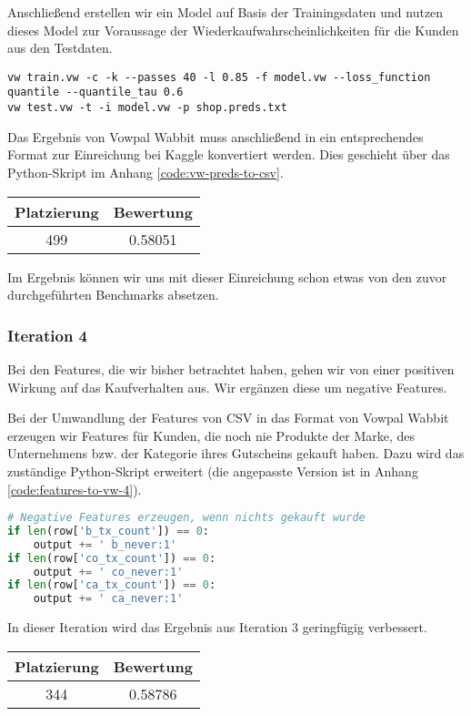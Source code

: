 Anschließend erstellen wir ein Model auf Basis der Trainingsdaten und nutzen dieses
Model zur Voraussage der Wiederkaufwahrscheinlichkeiten für die Kunden aus den Testdaten.
\begin{lstlisting}
vw train.vw -c -k --passes 40 -l 0.85 -f model.vw --loss_function quantile --quantile_tau 0.6
vw test.vw -t -i model.vw -p shop.preds.txt
\end{lstlisting}

Das Ergebnis von Vowpal Wabbit muss anschließend in ein entsprechendes Format zur Einreichung bei 
Kaggle konvertiert werden. Dies geschieht über das Python-Skript im Anhang 
\ref{code:vw-preds-to-csv}. 

\begin{tabular}{|c|c|}
	\hline \textbf{Platzierung} & \textbf{Bewertung} \\ 
	\hline 499 & 0.58051  \\ 
	\hline 
\end{tabular}

Im Ergebnis können wir uns mit dieser Einreichung
schon etwas von den zuvor durchgeführten Benchmarks absetzen.

\subsubsection{Iteration 4}
Bei den Features, die wir bisher betrachtet haben, gehen wir von einer
positiven Wirkung auf das Kaufverhalten aus. Wir ergänzen diese um negative Features.

Bei der Umwandlung der Features von CSV in das Format von Vowpal Wabbit 
erzeugen wir Features für Kunden, die noch nie Produkte der Marke,
des Unternehmens bzw. der Kategorie ihres Gutscheins gekauft haben.
Dazu wird das zuständige Python-Skript erweitert (die angepasste Version ist in Anhang 
\ref{code:features-to-vw-4}).
\begin{lstlisting}[language=Python]
# Negative Features erzeugen, wenn nichts gekauft wurde
if len(row['b_tx_count']) == 0:
	output += ' b_never:1'
if len(row['co_tx_count']) == 0:
	output += ' co_never:1'
if len(row['ca_tx_count']) == 0:
	output += ' ca_never:1'
\end{lstlisting}

In dieser Iteration wird das Ergebnis aus Iteration 3 geringfügig verbessert.

\begin{tabular}{|c|c|}
	\hline \textbf{Platzierung} & \textbf{Bewertung} \\ 
	\hline 344 & 0.58786  \\ 
	\hline 
\end{tabular}


